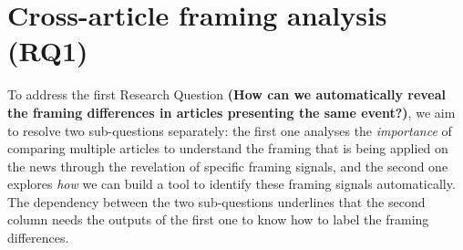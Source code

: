 



\section{Cross-article framing analysis (RQ1)}
\label{sec:prop_rq1}

To address the first Research Question
\textbf{(How can we automatically reveal the framing differences in articles presenting the same event?)}, we aim to resolve two sub-questions separately: the first one analyses the \textit{importance} of comparing multiple articles to understand the framing that is being applied on the news through the revelation of specific framing signals, and the second one explores \textit{how} we can build a tool to identify these framing signals automatically. The dependency between the two sub-questions underlines that the second column needs the outputs of the first one to know how to label the framing differences.



